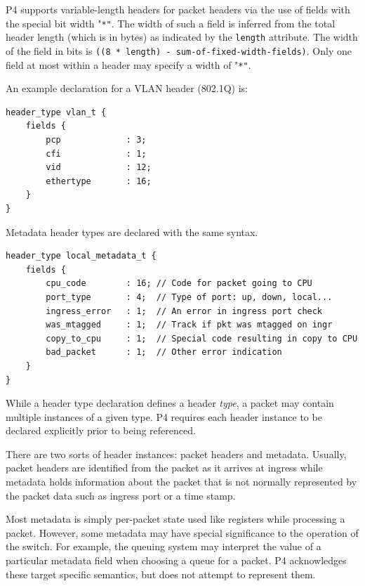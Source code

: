 \documentclass[12pt]{article}
\begin{document}
P4 supports variable-length headers for packet headers via the use of fields
with the special bit width "\texttt{*"}. The width of such a field is inferred from
the total header length (which is in bytes) as indicated by the \texttt{length} attribute.
 The width of the field in bits is \texttt{((8 * length) - sum-of-fixed-width-fields)}.
Only one field at most within a header may specify a width of "\texttt{*"}.

An example declaration for a VLAN header (802.1Q) is:

\begin{lstlisting}[keywords={},frame=single,escapechar=\@]
header_type vlan_t {
    fields {
        pcp             : 3;
        cfi             : 1;
        vid             : 12;
        ethertype       : 16;
    }
}
\end{lstlisting}

Metadata header types are declared with the same syntax.

\begin{lstlisting}[keywords={},frame=single,escapechar=\@]
header_type local_metadata_t {
    fields {
        cpu_code        : 16; // Code for packet going to CPU
        port_type       : 4;  // Type of port: up, down, local...
        ingress_error   : 1;  // An error in ingress port check
        was_mtagged     : 1;  // Track if pkt was mtagged on ingr
        copy_to_cpu     : 1;  // Special code resulting in copy to CPU
        bad_packet      : 1;  // Other error indication
    }
}
\end{lstlisting}



While a header type declaration defines a header \textit{type}, a packet may contain
multiple instances of a given type.  P4 requires each header instance to
be declared explicitly prior to being referenced.

There are two sorts of header instances: packet headers and metadata. Usually,
packet headers are identified from the packet as it arrives at ingress while
metadata holds information about the packet that is not normally represented
by the packet data such as ingress port or a time stamp.

Most metadata is simply per-packet state used like registers while processing
a packet.  However, some metadata may have special significance to the operation
of the switch.  For example, the queuing system may interpret the value of
a particular metadata field when choosing a queue for a packet.  P4 acknowledges
these target specific semantics, but does not attempt to represent them.
\end{document}
